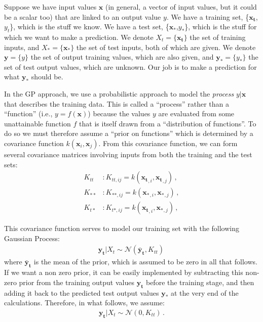 \documentclass[11pt,a4paper]{article}
\numberwithin{equation}{section}
\begin{document}
Suppose we have input values $\mathbf{x}$ (in general, a vector of input values, but it could be a scalar too) that are linked to an output value $y$. We have a training set, \{$\mathbf{x_t}$,$y_t$\}, which is the stuff we know. We have a test set, \{$\mathbf{x_*}$,$y_*$\}, which is the stuff for which we want to make a prediction. We denote $X_t = \{\mathbf{x_t}\}$ the set of training inputs, and $X_* = \{\mathbf{x_*}\}$ the set of test inputs, both of which are given. We denote $\mathbf{y} = \{y\}$ the set of output training values, which are also given, and $\mathbf{y_*} = \{y_*\}$ the set of test output values, which are unknown. Our job is to make a prediction for what $\mathbf{y_*}$ should be.

In the GP approach, we use a probabilistic approach to model the \emph{process} $y|\mathbf{x}$ that describes the training data. This is called a ``process'' rather than a ``function'' (i.e., $y = f(\mathbf{x})$) because the values $y$ are evaluated from some unattainable function $f$ that is itself drawn from a ``distribution of functions''. To do so we must therefore assume a ``prior on functions'' which is determined by a covariance function $k(\mathbf{x}_i, \mathbf{x}_j)$. From this covariance function, we can form several covariance matrices involving inputs from both the training and the test sets:
\begin{align}
K_{tt} &: K_{tt,ij} = k(\mathbf{x_t}_{,i},\mathbf{x_t}_{,j})\,, \\
K_{**} &: K_{**,ij} = k(\mathbf{x_*}_{,i},\mathbf{x_*}_{,j})\,, \\
K_{t*} &: K_{t*,ij} = k(\mathbf{x_t}_{,i},\mathbf{x_*}_{,j})\,,
\end{align}

This covariance function serves to model our training set with the following Gaussian Process:
\begin{align}
\mathbf{y_t} | X_t \sim \mathcal{N}(\mathbf{\bar{y}_t},K_{tt})\,
\end{align}
where $\mathbf{\bar{y}_t}$ is the mean of the prior, which is assumed to be zero in all that follows. If we want a non zero prior, it can be easily implemented by subtracting this non-zero prior from the training output values $\mathbf{y_t}$ before the training stage, and then adding it back to the predicted test output values $\mathbf{y_*}$ at the very end of the calculations. Therefore, in what follows, we assume:
\begin{align}
\mathbf{y_t} | X_t \sim \mathcal{N}(0,K_{tt})\,. \label{EQ:full_prior}
\end{align}
\end{document}

